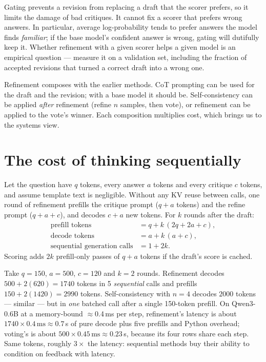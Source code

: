 \begin{pitfall}
Gating prevents a revision from replacing a draft that the scorer prefers, so it limits the damage
of bad critiques. It cannot fix a scorer that prefers wrong answers. In particular, average
log-probability tends to prefer answers the model finds \emph{familiar}; if the base model's
confident answer is wrong, gating will dutifully keep it. Whether refinement with a given scorer
helps a given model is an empirical question --- measure it on a validation set, including the
fraction of accepted revisions that turned a correct draft into a wrong one.
\end{pitfall}

Refinement composes with the earlier methods. CoT prompting can be used for the draft and the
revision; with a base model it should be. Self-consistency can be applied \emph{after} refinement
(refine $n$ samples, then vote), or refinement can be applied to the vote's winner. Each composition
multiplies cost, which brings us to the systems view.

\section{The cost of thinking sequentially}\label{sec:refine:cost}

Let the question have $q$ tokens, every answer $a$ tokens and every critique $c$ tokens, and assume
template text is negligible. Without any KV reuse between calls, one round of refinement prefills
the critique prompt ($q + a$ tokens) and the refine prompt ($q + a + c$), and decodes $c + a$ new
tokens. For $k$ rounds after the draft:
\begin{align}
  \text{prefill tokens} &= q + k\,(2q + 2a + c), \label{eq:refine:prefill}\\
  \text{decode tokens}  &= a + k\,(a + c), \\
  \text{sequential generation calls} &= 1 + 2k.
\end{align}
Scoring adds $2k$ prefill-only passes of $q + a$ tokens if the draft's score is cached.

\begin{napkinmath}
Take $q = 150$, $a = 500$, $c = 120$ and $k = 2$ rounds. Refinement decodes $500 + 2(620) = 1740$
tokens in 5 \emph{sequential} calls and prefills $150 + 2(1420) = 2990$ tokens. Self-consistency with
$n = 4$ decodes $2000$ tokens --- similar --- but in \emph{one} batched call after a single 150-token
prefill. On Qwen3-0.6B at a memory-bound $\approx$0.4\,ms per step, refinement's latency is about
$1740 \times 0.4\,\text{ms} \approx 0.7$\,s of pure decode plus five prefills and Python overhead;
voting's is about $500 \times 0.45\,\text{ms} \approx 0.23$\,s, because its four rows share each
step. Same tokens, roughly $3\times$ the latency: sequential methods buy their ability to condition on
feedback with latency.
\end{napkinmath}

